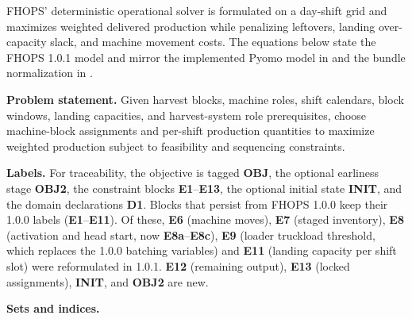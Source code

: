 FHOPS' deterministic operational solver is formulated on a day-shift
grid and maximizes weighted delivered production while penalizing
leftovers, landing over-capacity slack, and machine movement costs. The
equations below state the FHOPS 1.0.1 model and mirror the implemented
Pyomo model in
 and the
bundle normalization in
.

\textbf{Problem statement.} Given harvest blocks, machine roles, shift
calendars, block windows, landing capacities, and harvest-system role
prerequisites, choose machine-block assignments and per-shift production
quantities to maximize weighted production subject to feasibility and
sequencing constraints.

\textbf{Labels.} For traceability, the objective is tagged \textbf{OBJ},
the optional earliness stage \textbf{OBJ2}, the constraint blocks
\textbf{E1}--\textbf{E13}, the optional initial state \textbf{INIT}, and
the domain declarations \textbf{D1}. Blocks that persist from FHOPS
1.0.0 keep their 1.0.0 labels (\textbf{E1}--\textbf{E11}). Of these,
\textbf{E6} (machine moves), \textbf{E7} (staged inventory), \textbf{E8}
(activation and head start, now \textbf{E8a}--\textbf{E8c}), \textbf{E9}
(loader truckload threshold, which replaces the 1.0.0 batching
variables) and \textbf{E11} (landing capacity per shift slot) were
reformulated in 1.0.1. \textbf{E12} (remaining output), \textbf{E13}
(locked assignments), \textbf{INIT}, and \textbf{OBJ2} are new.

\textbf{Sets and indices.}

